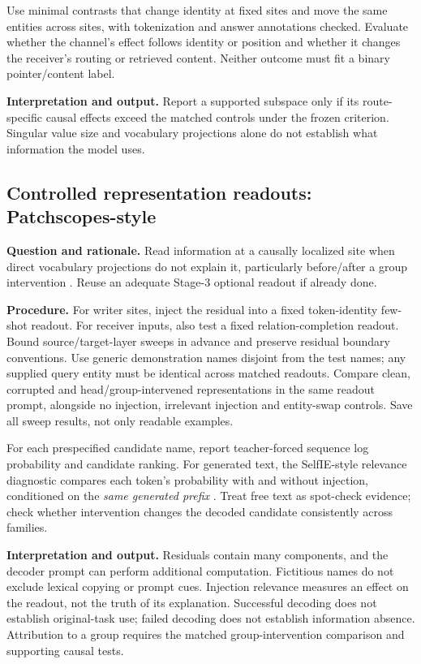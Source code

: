 \documentclass[11pt,a4paper]{article}
\newcommand{\purpose}{\textbf{Question and rationale.} }
\newcommand{\procedure}{\textbf{Procedure.} }
\newcommand{\interpretation}{\textbf{Interpretation and output.} }
\begin{document}
Use minimal contrasts that change identity at fixed sites and move the same
entities across sites, with tokenization and answer annotations checked.
Evaluate whether the channel's effect follows identity or position and whether
it changes the receiver's routing or retrieved content. Neither outcome must
fit a binary pointer/content label.

\interpretation Report a supported subspace only if its route-specific causal
effects exceed the matched controls under the frozen criterion. Singular value
size and vocabulary projections alone do not establish what information the
model uses.

\subsection{Controlled representation readouts: Patchscopes-style}
\purpose Read information at a causally localized site when direct vocabulary
projections do not explain it, particularly before/after a group intervention
\cite{patchscopes}. Reuse an adequate Stage-3 optional readout if already done.

\procedure For writer sites, inject the residual into a fixed token-identity
few-shot readout. For receiver inputs, also test a fixed relation-completion
readout. Bound source/target-layer sweeps in advance and preserve residual
boundary conventions. Use generic demonstration names disjoint from the test
names; any supplied query entity must be identical across matched readouts.
Compare clean, corrupted and head/group-intervened representations in the same
readout prompt, alongside no injection, irrelevant injection and entity-swap
controls. Save all sweep results, not only readable examples.

For each prespecified candidate name, report teacher-forced sequence log
probability and candidate ranking. For generated text, the SelfIE-style
relevance diagnostic compares each token's probability with and without
injection, conditioned on the \emph{same generated prefix} \cite{selfie}.
Treat free text as spot-check evidence; check whether intervention changes the
decoded candidate consistently across families.

\interpretation Residuals contain many components, and the decoder prompt can
perform additional computation. Fictitious names do not exclude lexical copying
or prompt cues. Injection relevance measures an effect on the readout, not the
truth of its explanation. Successful decoding does not establish original-task
use; failed decoding does not establish information absence. Attribution to a
group requires the matched group-intervention comparison and supporting causal
tests.
\end{document}
